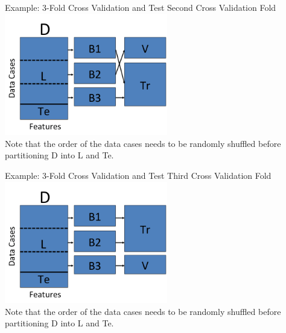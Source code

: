 \documentclass[serif,xcolor=pdftex,dvipsnames,table,hyperref={bookmarks=false}]{beamer}
\begin{document}
\begin{frame}[t]{Example: 3-Fold Cross Validation and Test}
\center
Second Cross Validation Fold\\
\includegraphics[width=2.8in]{../Figures/model-selection-cv-te-2.png}\\
Note that the order of the data cases needs to be randomly
shuffled before partitioning D into L and Te.  
\end{frame}

\begin{frame}[t]{Example: 3-Fold Cross Validation and Test}
\center
Third Cross Validation Fold\\
\includegraphics[width=2.8in]{../Figures/model-selection-cv-te-3.png}\\
Note that the order of the data cases needs to be randomly
shuffled before partitioning D into L and Te. 
\end{frame}
\end{document}
